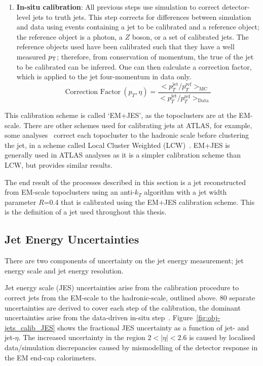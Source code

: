\begin{enumerate}[leftmargin=*]
\item\textbf{In-situ calibration}:
  All previous steps use simulation to correct detector-level jets to truth jets.
  This step corrects for differences between simulation and data using events
  containing a jet to be calibrated and a reference object;
  the reference object is a photon, a $Z$ boson, or a set of calibrated jets.
  The reference objects used have been calibrated such that they have a well measured $p_{\mathrm{T}}$;
  therefore, from conservation of momentum, the true \pT{} of the jet to be calibrated can be inferred.
  One can then calculate a correction factor, which is applied to the jet four-momentum in data only.
  \begin{equation}
    \text{Correction Factor}~(p_T, \eta) = \frac{ < p_T^{\text{jet}}/p_T^{\text{ref}}>_{\text{MC}} }{ < p_T^{\text{jet}}/p_T^{\text{ref}}>_{\text{Data}} }
  \end{equation}
\end{enumerate}

This calibration scheme is called `EM+JES', as the topoclusters are at the EM-scale.
There are other schemes used for calibrating jets at ATLAS,
for example, some analyses~\cite{obj-VVjj} correct each topocluster to the hadronic scale
before clustering the jet, in a scheme called Local Cluster Weighted (LCW)~\cite{obj-jets_topo}.
EM+JES is generally used in ATLAS analyses as it is a simpler calibration scheme than LCW, but provides similar results.

The end result of the processes described in this section is a jet
reconstructed from EM-scale topoclusters using an anti-$k_T$ algorithm with a jet width parameter $R$=0.4
that is calibrated using the EM+JES calibration scheme.
This is the definition of a jet used throughout this thesis.

\newpage

\subsection{Jet Energy Uncertainties}
\label{sec:obj-jets_uncert}

There are two components of uncertainty on the jet energy measurement; jet energy scale and jet energy resolution.

Jet energy scale (JES) uncertainties arise from the calibration procedure
to correct jets from the EM-scale to the hadronic-scale, outlined above.
80 separate uncertainties are derived to cover each step of the calibration,
the dominant uncertainties arise from the data-driven in-situ step~\cite{obj-jets_calib_run2}.
Figure~\ref{fig:obj-jets_calib_JES} shows the fractional JES uncertainty as a function of jet-\pT{} and jet-$\eta$.
The increased uncertainty in the region $2 < |\eta| < 2.6$ is caused by localised data/simulation discrepancies
caused by mismodelling of the detector response in the EM end-cap calorimeters.



